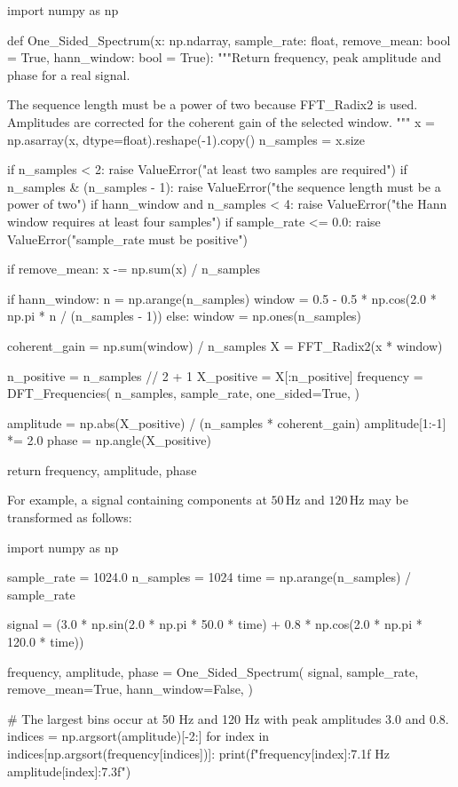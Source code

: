 \begin{python}
import numpy as np


def One_Sided_Spectrum(x: np.ndarray,
                       sample_rate: float,
                       remove_mean: bool = True,
                       hann_window: bool = True):
    """Return frequency, peak amplitude and phase for a real signal.

    The sequence length must be a power of two because FFT_Radix2 is used.
    Amplitudes are corrected for the coherent gain of the selected window.
    """
    x = np.asarray(x, dtype=float).reshape(-1).copy()
    n_samples = x.size

    if n_samples < 2:
        raise ValueError("at least two samples are required")
    if n_samples & (n_samples - 1):
        raise ValueError("the sequence length must be a power of two")
    if hann_window and n_samples < 4:
        raise ValueError("the Hann window requires at least four samples")
    if sample_rate <= 0.0:
        raise ValueError("sample_rate must be positive")

    if remove_mean:
        x -= np.sum(x) / n_samples

    if hann_window:
        n = np.arange(n_samples)
        window = 0.5 - 0.5 * np.cos(2.0 * np.pi * n / (n_samples - 1))
    else:
        window = np.ones(n_samples)

    coherent_gain = np.sum(window) / n_samples
    X = FFT_Radix2(x * window)

    n_positive = n_samples // 2 + 1
    X_positive = X[:n_positive]
    frequency = DFT_Frequencies(
        n_samples,
        sample_rate,
        one_sided=True,
    )

    amplitude = np.abs(X_positive) / (n_samples * coherent_gain)
    amplitude[1:-1] *= 2.0
    phase = np.angle(X_positive)

    return frequency, amplitude, phase
\end{python}

For example, a signal containing components at $ 50\,\mathrm{Hz} $ and
$ 120\,\mathrm{Hz} $ may be transformed as follows:

\begin{python}
import numpy as np


sample_rate = 1024.0
n_samples = 1024
time = np.arange(n_samples) / sample_rate

signal = (3.0 * np.sin(2.0 * np.pi * 50.0 * time)
          + 0.8 * np.cos(2.0 * np.pi * 120.0 * time))

frequency, amplitude, phase = One_Sided_Spectrum(
    signal,
    sample_rate,
    remove_mean=True,
    hann_window=False,
)

# The largest bins occur at 50 Hz and 120 Hz with peak amplitudes 3.0 and 0.8.
indices = np.argsort(amplitude)[-2:]
for index in indices[np.argsort(frequency[indices])]:
    print(f"{frequency[index]:7.1f} Hz  {amplitude[index]:7.3f}")
\end{python}

